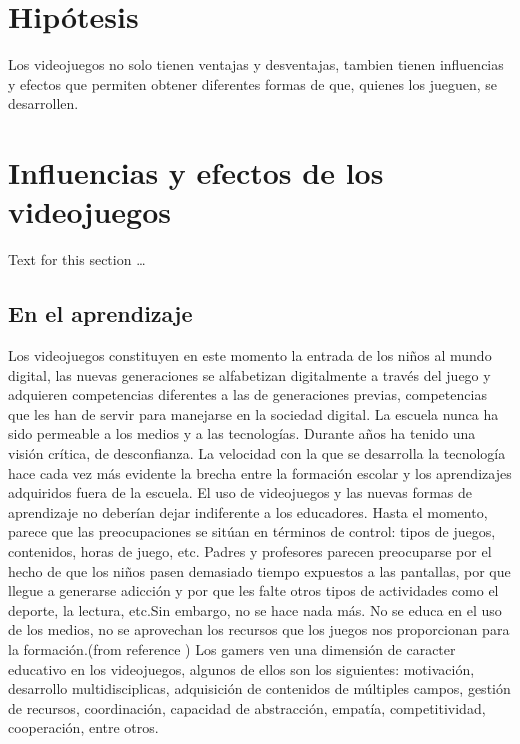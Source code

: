 \documentclass{bmcart}
\begin{document}
\section*{Hipótesis}
Los videojuegos no solo tienen ventajas y desventajas, tambien tienen influencias y efectos que permiten obtener diferentes formas de que, quienes los jueguen, se desarrollen. %


\section*{Influencias y efectos de los videojuegos}
Text for this section \ldots

\subsection*{En el aprendizaje}
Los videojuegos constituyen en este momento la entrada de los niños al mundo digital, las nuevas generaciones se alfabetizan digitalmente a través del juego y adquieren competencias diferentes a las de generaciones previas, competencias que les han de servir para manejarse en la sociedad digital.
\newline
La escuela nunca ha sido permeable a los medios y a las tecnologías.
Durante años ha tenido una visión crítica, de desconfianza. La velocidad con la que se desarrolla la tecnología hace cada vez más evidente la brecha entre la formación escolar y los aprendizajes adquiridos fuera de la escuela.
\newline
El uso de videojuegos y las nuevas formas de aprendizaje no deberían dejar indiferente a los educadores. Hasta el momento, parece que las preocupaciones se sitúan en términos de control: tipos de juegos, contenidos, horas de juego, etc. Padres y profesores parecen preocuparse por el hecho de que los niños pasen demasiado tiempo expuestos a las pantallas, por que llegue a generarse adicción y por que les falte otros tipos de actividades como el deporte, la lectura, etc.Sin embargo, no se hace nada más. No se educa en el uso de los medios, no se aprovechan los recursos que los juegos nos proporcionan para la formación.(from reference \cite{salvat2008videojuegos})
\newline
Los gamers ven una dimensión de caracter educativo en los videojuegos, algunos de ellos son los siguientes: motivación, desarrollo multidisciplicas, adquisición de contenidos de múltiples campos, gestión de recursos, coordinación, capacidad de abstracción, empatía, competitividad, cooperación, entre otros. \cite{dominguez2012que}
\end{document}
